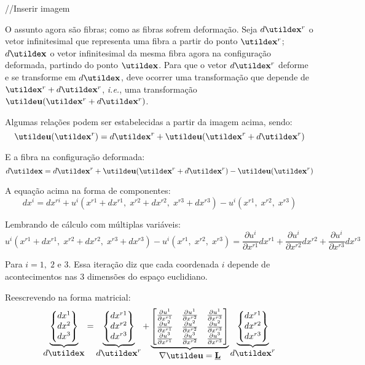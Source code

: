 //Inserir imagem
	
O assunto agora são fibras; como as fibras sofrem deformação. Seja $d\vt{x}^r$ o vetor infinitesimal que representa uma fibra a partir do ponto $\vt{x}^r$; $d\vt{x}$ o vetor infinitesimal da mesma fibra agora na configuração deformada, partindo do ponto $\vt{x}$.
Para que o vetor $d\vt{x}^r$ deforme e se transforme em $d\vt{x}$, deve ocorrer uma transformação que depende de $\vt{x}^r+d\vt{x}^r$, \textit{i.e.}, uma transformação $\vt{u}(\vt{x}^r+d\vt{x}^r)$.
	
Algumas relações podem ser estabelecidas a partir da imagem acima, sendo:
\[\vt{u}(\vt{x}^r)=d\vt{x}^r+\vt{u}(\vt{x}^r+d\vt{x}^r)\]
	
E a fibra na configuração deformada:	
\[d\vt{x}=d\vt{x}^r+\vt{u}(\vt{x}^r+d\vt{x}^r)-\vt{u}(\vt{x}^r)\]
	
A equação acima na forma de componentes:
\[dx^i=dx^{ri}+u^i(x^{r1}+dx^{r1},\;x^{r2}+dx^{r2},\;x^{r3}+dx^{r3})-u^i(x^{r1},\;x^{r2},\;x^{r3})\]
	
Lembrando de cálculo com múltiplas variáveis:
\[u^i(x^{r1}+dx^{r1},\;x^{r2}+dx^{r2},\;x^{r3}+dx^{r3})-u^i(x^{r1},\;x^{r2},\;x^{r3})=\frac{\partial u^i}{\partial x^{r1}}dx^{r1}+\frac{\partial u^i}{\partial x^{r2}}dx^{r2}+\frac{\partial u^i}{\partial x^{r3}}dx^{r3}\]
	
Para $i=1,\;2$ e $3$. Essa iteração diz que cada coordenada $i$ depende de acontecimentos nas $3$ dimensões do espaço euclidiano.
	
Reescrevendo na forma matricial:
\[
	\underbrace{
	\begin{Bmatrix}
		dx^1 \\ dx^2 \\ dx^3
	\end{Bmatrix}
	}_{\displaystyle d\vt{x}}
	=
	\underbrace{
	\begin{Bmatrix}
		dx^{r1} \\ dx^{r2} \\ dx^{r3}
	\end{Bmatrix}
	}_{\displaystyle d\vt{x}^r}
	+
	\underbrace{
	\begin{bmatrix}
		\frac{\partial u^1}{\partial x^{r1}} & \frac{\partial u^1}{\partial x^{r2}} & \frac{\partial u^1}{\partial x^{r3}} \\
		\frac{\partial u^2}{\partial x^{r1}} & \frac{\partial u^2}{\partial x^{r2}} & \frac{\partial u^2}{\partial x^{r3}} \\
		\frac{\partial u^3}{\partial x^{r1}} & \frac{\partial u^3}{\partial x^{r2}} & \frac{\partial u^3}{\partial x^{r3}}
	\end{bmatrix}
	}_{\displaystyle\nabla\vt{u}=\ts{L}}
	\underbrace{
	\begin{Bmatrix}
		dx^{r1} \\ dx^{r2} \\ dx^{r3}
	\end{Bmatrix}
	}_{\displaystyle d\vt{x}^r}
\]
	
